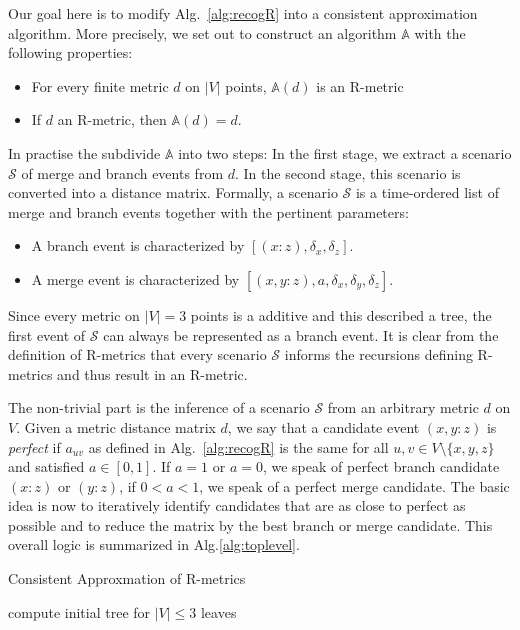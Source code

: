 \documentclass{article}
\begin{document}
Our goal here is to modify Alg.~\ref{alg:recogR} into a consistent
approximation algorithm. More precisely, we set out to construct an
algorithm $\mathbb{A}$ with the following properties:
\begin{itemize} 
  \item For every finite metric $d$ on $|V|$ points, $\mathbb{A}(d)$ 
    is an R-metric
  \item If $d$ an R-metric, then $\mathbb{A}(d)=d$. 
\end{itemize} 
In practise the subdivide $\mathbb{A}$ into two steps: In the first stage,
we extract a scenario $\mathcal{S}$ of merge and branch events from $d$. In
the second stage, this scenario is converted into a distance
matrix. Formally, a scenario $\mathcal{S}$ is a time-ordered list of merge
and branch
events together with the pertinent parameters: \\
\begin{itemize} 
  \item[] A branch event is characterized by $[(x:z),\delta_x,\delta_z]$.
  \item[] A merge event is characterized by
    $[(x,y:z),a,\delta_x,\delta_y,\delta_z]$.
\end{itemize} 
Since every metric on $|V|=3$ points is a additive and this described a
tree, the first event of $\mathcal{S}$ can always be represented as a
branch event. It is clear from the definition of R-metrics that every
scenario $\mathcal{S}$ informs the recursions defining R-metrics and thus
result in an R-metric. 

The non-trivial part is the inference of a scenario $\mathcal{S}$ from an
arbitrary metric $d$ on $V$. Given a metric distance matrix $d$, we say
that a candidate event $(x,y:z)$ is \emph{perfect} if $a_{uv}$ as defined
in Alg.~\ref{alg:recogR} is the same for all $u,v\in V\setminus\{x,y,z\}$
and satisfied $a\in [0,1]$. If $a=1$ or $a=0$, we speak of perfect branch
candidate $(x:z)$ or $(y:z)$, if $0<a<1$, we speak of a perfect merge
candidate. The basic idea is now to iteratively identify candidates that
are as close to perfect as possible and to reduce the matrix by the best
branch or merge candidate. This overall logic is summarized in
Alg.\ref{alg:toplevel}.

\begin{algorithm}[H]
\caption{Consistent Approxmation of R-metrics}
\label{alg:toplevel}
 \SetAlgoLined
 compute initial tree for $|V|\le 3$ leaves\;
\end{algorithm} 
\end{document}

